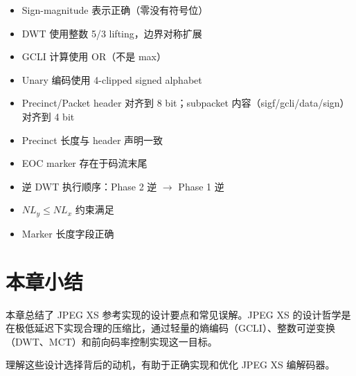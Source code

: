 \begin{itemize}
  \item[\checkmark] Sign-magnitude 表示正确（零没有符号位）
  \item[\checkmark] DWT 使用整数 5/3 lifting，边界对称扩展
  \item[\checkmark] GCLI 计算使用 OR（不是 max）
  \item[\checkmark] Unary 编码使用 4-clipped signed alphabet
  \item[\checkmark] Precinct/Packet header 对齐到 8 bit；subpacket 内容（sigf/gcli/data/sign）对齐到 4 bit
  \item[\checkmark] Precinct 长度与 header 声明一致
  \item[\checkmark] EOC marker 存在于码流末尾
  \item[\checkmark] 逆 DWT 执行顺序：Phase 2 逆 $\to$ Phase 1 逆
  \item[\checkmark] $NL_y \leq NL_x$ 约束满足
  \item[\checkmark] Marker 长度字段正确
\end{itemize}

\section{本章小结}

本章总结了 JPEG XS 参考实现的设计要点和常见误解。JPEG XS 的设计哲学是在极低延迟下实现合理的压缩比，通过轻量的熵编码（GCLI）、整数可逆变换（DWT、MCT）和前向码率控制实现这一目标。

理解这些设计选择背后的动机，有助于正确实现和优化 JPEG XS 编解码器。
